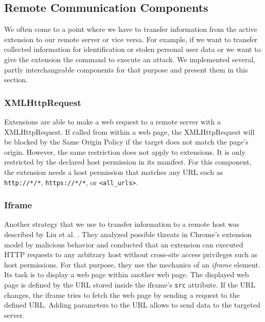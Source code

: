 \subsection{Remote Communication Components}
\label{sec:remoteCommunication}

	We often come to a point where we have to transfer information from the active extension to our remote server or vice versa. For example, if we want to transfer collected information for identification or stolen personal user data or we want to give the extension the command to execute an attack. We implemented several, partly interchangeable components for that purpose and present them in this section.

\subsubsection{XMLHttpRequest}
\label{sec:xhrCommunication}

	Extensions are able to make a web request to a remote server with a XMLHttpRequest. If called from within a web page, the XMLHttpRequest will be blocked by the Same Origin Policy if the target does not match the page's origin. However, the same restriction does not apply to extensions. It is only restricted by the declared host permission in its manifest. For this component, the extension needs a host permission that matches any URL such as \texttt{http://*/*}, \texttt{https://*/*}, or \texttt{<all\_urls>}. 

\subsubsection{Iframe}
\label{sec:iframeCommunication}

	Another strategy that we use to transfer information to a remote host was described by Liu et al. \cite{Liu12chromeextensions:}. They analyzed possible threats in Chrome's extension model by malicious behavior and conducted that an extension can executed HTTP requests to any arbitrary host without cross-site access privileges such as host permissions. For that purpose, they use the mechanics of an \textit{iframe} element. Its task is to display a web page within another web page. The displayed web page is defined by the URL stored inside the iframe's \texttt{src} attribute. If the URL changes, the iframe tries to fetch the web page by sending a request to the defined URL. Adding parameters to the URL allows to send data to the targeted server. 


